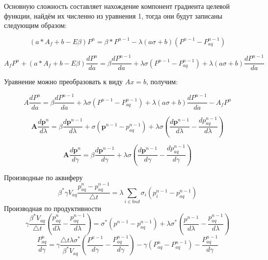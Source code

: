 \documentclass[14pt]{article}
\begin{document}
Основную сложность составляет нахождение компонент градиента целевой функции, найдём их численно из уравнения 1, тогда они будут записаны следующим образом:

\begin{equation} \label{rp}
(a*A_f+b-E\beta)P^n = \beta*P^{n-1} - \lambda(a\sigma+b)(P^{n-1}-P_{aq}^{n-1})
\end{equation}

\begin{equation} \label{rp}
A_fP^n + (a*A_f+b-E\beta)\frac{dP^n}{da} = \beta\frac{dP^{n-1}}{da} + \lambda\sigma(P^{n-1}-P_{aq}^{n-1})+\lambda(a\sigma+b)\frac{dP^{n-1}}{da}
\end{equation}

Уравнение можно преобразовать к виду $Ax=b$, получим:

\begin{equation} \label{rp}
A\frac{dP^n}{da} = \beta\frac{dP^{n-1}}{da} + \lambda\sigma(P^{n-1}-P_{aq}^{n-1})+\lambda(a\sigma+b)\frac{dP^{n-1}}{da} - A_fP^n 
\end{equation}

\begin{equation} \label{rp}
\boldsymbol{A}\frac{d\boldsymbol{p}^n}{d\lambda} = \beta\frac{d\boldsymbol{p}^{n-1}}{d\lambda} + \sigma(\boldsymbol{p}^{n-1}-p_{aq}^{n-1})+\lambda\sigma(\frac{d\boldsymbol{p}^{n-1}}{d\lambda}-\frac{dp_{aq}^{n-1}}{d\lambda})
\end{equation}

\begin{equation} \label{rp}
\boldsymbol{A}\frac{d\boldsymbol{p}^n}{d\gamma} = \beta\frac{d\boldsymbol{p}^{n-1}}{d\gamma} + \lambda\sigma(\frac{d\boldsymbol{p}^{n-1}}{d\gamma}-\frac{dp_{aq}^{n-1}}{d\gamma})
\end{equation}

Производные по аквиферу
\begin{equation} \label{rp}
\beta^* \gamma V_{aq}\frac{p_{aq}^n - p_{aq}^{n-1}}{\bigtriangleup t} = \lambda\sum_{i \in bnd}\sigma_i(p_i^{n-1}-p_{aq}^{n-1})
\end{equation}
Производная по продуктивности
\begin{equation} \label{rp}
\gamma\frac{\beta^* V_{aq}}{\bigtriangleup t} \left(\frac{p_{aq}^n}{d\lambda}  -\frac{p_{aq}^{n-1}}{d\lambda}\right) =\sigma^*(p^{n-1}-p_{aq}^{n-1}) +  \lambda\sigma^*(\frac{p^{n-1}}{d\lambda}-\frac{p_{aq}^{n-1}}{d\lambda})
\end{equation}
\begin{equation} \label{rp}
\frac{P_{aq}^n}{d\gamma} = \gamma\frac{\bigtriangleup t \lambda\sigma^*}{\beta^* V_{aq}} \left( \frac{P^{n-1}}{d\gamma}-\frac{P_{aq}^{n-1}}{d\gamma}\right) - \gamma (P_{aq}^n - P_{aq}^{n-1}) -\frac{P_{aq}^{n-1}}{d\gamma}
\end{equation}
\end{document}
